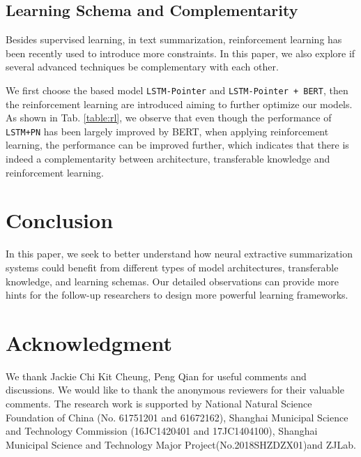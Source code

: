 \documentclass[11pt,a4paper]{article}
\begin{document}
\subsection{Learning Schema and Complementarity} \label{eq:schema}
Besides supervised learning, in text summarization, reinforcement learning has been recently used to introduce more constraints.
In this paper, we also explore if several advanced techniques be complementary with each other.

We first choose the based model \texttt{LSTM-Pointer} and \texttt{LSTM-Pointer + BERT}, then the reinforcement learning are introduced aiming to further optimize our models.
As shown in Tab. \ref{table:rl}, we observe that even though the performance of \texttt{LSTM+PN} has been largely improved by BERT, when applying reinforcement learning, the performance can be improved further, which indicates that there is indeed a complementarity between architecture, transferable knowledge and reinforcement learning.





\section{Conclusion}
In this paper, we seek to better understand how neural extractive summarization systems could  benefit  from  different  types  of model architectures, transferable knowledge, and learning  schemas. Our detailed observations can provide more hints for the follow-up researchers to design more powerful learning frameworks.





















\section*{Acknowledgment}
We thank Jackie Chi Kit Cheung, Peng Qian for useful comments and discussions.
We would like to thank the anonymous reviewers for their valuable comments. The research work is supported by National Natural Science Foundation of China (No. 61751201 and 61672162),
Shanghai Municipal Science and Technology Commission (16JC1420401 and 17JC1404100),
Shanghai Municipal Science and Technology Major Project(No.2018SHZDZX01)and ZJLab.






\end{document}
